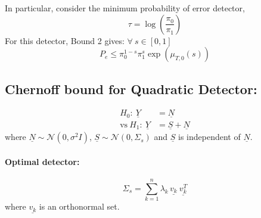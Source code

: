 \documentclass[12pt,a4paper]{article}
\begin{document}
In particular, consider the minimum probability of error detector,
\begin{equation} \tau =\log\left(\frac{\pi_0}{\pi_1} \right) 
\end{equation}
For this detector, Bound 2 gives: 
$\forall \:s\in\left[ 0,1\right]$ 
\begin{equation}P_e \leq \pi_0^{1-s}\pi_1^{s}\exp\left(\mu_{T,0}\left( s\right) \right)
\end{equation}
\subsection{Chernoff bound for Quadratic Detector:}
\begin{align*}
H_0:\: \underline{Y}&=\underline{N}\\
\text{vs}\ H_1:\: \underline{Y}&=\underline{S}+\underline{N}
\end{align*}
where $ \underline{N} \sim \mathcal{N}(0,\sigma^2 I)$, $ \underline{S} \sim \mathcal{N}(0,\Sigma_s)$ and $ \underline{S}$ is independent of $ \underline{N}$.
\paragraph{Optimal detector:}
\begin{equation}\Sigma_s=\sum_{k=1}^{n}\lambda_k\, \underline{v_k}\:\underline{v_k^T}
\end{equation}
where $\underline{v_k}$ is an orthonormal set.
\end{document}

